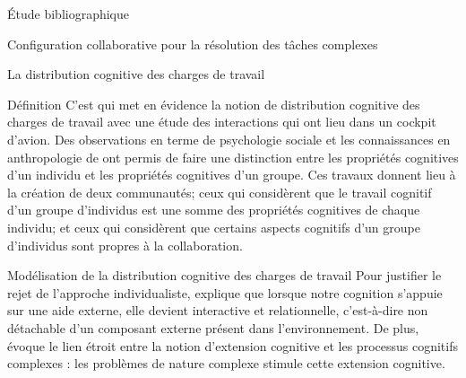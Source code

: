 \documentclass[myfrancais,ngerman,english,french]{mythesis}
\begin{document}
\begin{mychapter}{Étude bibliographique}
\begin{mysection}{Configuration collaborative pour la résolution des tâches complexes}
\begin{mysubsection}{La distribution cognitive des charges de travail}
\begin{mysubsubsection}{Définition}
					C'est  qui met en évidence la notion de distribution cognitive des charges de travail avec une étude des interactions qui ont lieu dans un cockpit d'avion.
					Des observations en terme de psychologie sociale et les connaissances en anthropologie de  ont permis de faire une distinction entre les propriétés cognitives d'un individu et les propriétés cognitives d'un groupe.
					Ces travaux donnent lieu à la création de deux communautés; ceux qui considèrent que le travail cognitif d'un groupe d'individus est une somme des propriétés cognitives de chaque individu; et ceux qui considèrent que certains aspects cognitifs d'un groupe d'individus sont propres à la collaboration.
				\end{mysubsubsection}
				\begin{mysubsubsection}{Modélisation de la distribution cognitive des charges de travail}
					Pour justifier le rejet de l'approche individualiste,  explique que lorsque notre cognition s'appuie sur une aide externe, elle devient interactive et relationnelle, c'est-à-dire non détachable d'un composant externe présent dans l'environnement.
					De plus,  évoque le lien étroit entre la notion d'extension cognitive et les processus cognitifs complexes : les problèmes de nature complexe stimule cette extension cognitive.


\end{mysubsubsection}
\end{mysubsection}
\end{mysection}
\end{mychapter}
\end{document}
